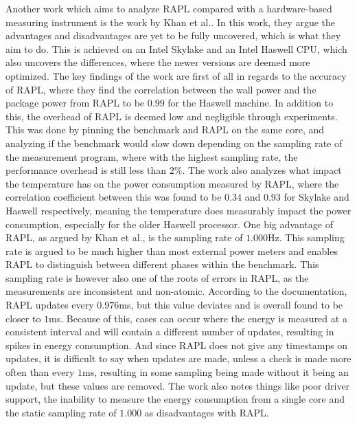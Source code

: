 Another work which aims to analyze RAPL compared with a hardware-based measuring instrument is the work by Khan et al.\cite*[]{RAPL_in_action}. In this work, they argue the advantages and disadvantages are yet to be fully uncovered, which is what they aim to do. This is achieved on an Intel Skylake and an Intel Haswell CPU, which also uncovers the differences, where the newer versions are deemed more optimized. The key findings of the work are first of all in regards to the accuracy of RAPL, where they find the correlation between the wall power and the package power from RAPL to be $0.99$ for the Haswell machine. In addition to this, the overhead of RAPL is deemed low and negligible through experiments. This was done by pinning the benchmark and RAPL on the same core, and analyzing if the benchmark would slow down depending on the sampling rate of the measurement program, where with the highest sampling rate, the performance overhead is still less than $2\%$. The work also analyzes what impact the temperature has on the power consumption measured by RAPL, where the correlation coefficient between this was found to be $0.34$ and $0.93$ for Skylake and Haswell respectively, meaning the temperature does measurably impact the power consumption, especially for the older Haswell processor. One big advantage of RAPL, as argued by Khan et al.\cite*[]{RAPL_in_action}, is the sampling rate of $1.000$Hz. This sampling rate is argued to be much higher than most external power meters and enables RAPL to distinguish between different phases within the benchmark. This sampling rate is however also one of the roots of errors in RAPL, as the measurements are inconsistent and non-atomic. According to the documentation, RAPL updates every $0.976$ms, but this value deviates and is overall found to be closer to $1$ms. Because of this, cases can occur where the energy is measured at a consistent interval and will contain a different number of updates, resulting in spikes in energy consumption. And since RAPL does not give any timestamps on updates, it is difficult to say when updates are made, unless a check is made more often than every $1$ms, resulting in some sampling being made without it being an update, but these values are removed. The work\cite*[]{RAPL_in_action} also notes things like poor driver support, the inability to measure the energy consumption from a single core and the static sampling rate of $1.000$ as disadvantages with RAPL.\cite*{RAPL_in_action}\nytafsnit


